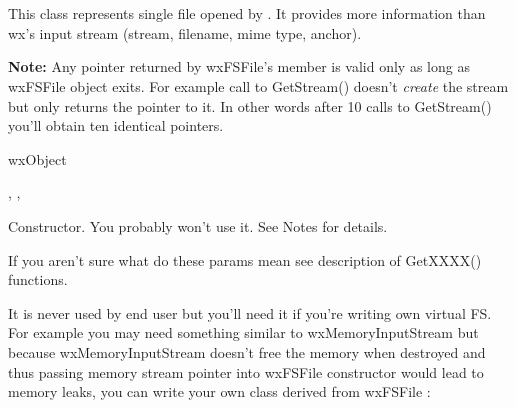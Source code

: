 %
%

\section{}\label{wxfsfile}

This class represents single file opened by .
It provides more information than wx's input stream 
(stream, filename, mime type, anchor).

{\bf Note:} Any pointer returned by wxFSFile's member is valid
only as long as wxFSFile object exits. For example call to GetStream()
doesn't {\it create} the stream but only returns the pointer to it. In
other words after 10 calls to GetStream() you'll obtain ten identical
pointers.


wxObject


, 
,


\label{wxfsfilewxfsfile}


Constructor. You probably won't use it. See Notes for details.






If you aren't sure what do these params mean see description of GetXXXX()
functions.


It is never used by end user but you'll need it if
you're writing own virtual FS. For example you may need something
similar to wxMemoryInputStream but because wxMemoryInputStream
doesn't free the memory when destroyed and thus passing memory stream
pointer into wxFSFile constructor would lead to memory leaks, you
can write your own class derived from wxFSFile :

